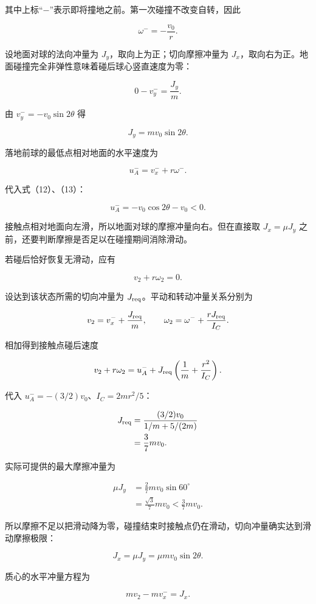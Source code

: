 \documentclass[12pt,a4paper,UTF8]{ctexart}
\begin{document}
其中上标``\(-\)''表示即将撞地之前。第一次碰撞不改变自转，因此

\[
\omega^-=-\frac{v_0}{r}.
\tag{13}
\]

设地面对球的法向冲量为 \(J_y\)，取向上为正；切向摩擦冲量为
\(J_x\)，取向右为正。地面碰撞完全非弹性意味着碰后球心竖直速度为零：

\[
0-v_y^-=\frac{J_y}{m}.
\tag{14}
\]

由 \(v_y^-=-v_0\sin2\theta\) 得

\[
\boxed{
J_y=mv_0\sin2\theta
}.
\tag{15}
\]

落地前球的最低点相对地面的水平速度为

\[
u_A^-=v_x^-+r\omega^-.
\tag{16}
\]

代入式（12）、（13）：

\[
u_A^-
=-v_0\cos2\theta-v_0<0.
\tag{17}
\]

接触点相对地面向左滑，所以地面对球的摩擦冲量向右。但在直接取
\(J_x=\mu J_y\) 之前，还要判断摩擦是否足以在碰撞期间消除滑动。

若碰后恰好恢复无滑动，应有

\[
v_2+r\omega_2=0.
\]

设达到该状态所需的切向冲量为 \(J_{\rm req}\)。平动和转动冲量关系分别为

\[
v_2=v_x^-+\frac{J_{\rm req}}m,
\qquad
\omega_2=\omega^-+\frac{rJ_{\rm req}}{I_C}.
\]

相加得到接触点碰后速度

\[
v_2+r\omega_2
=u_A^-+
J_{\rm req}\left(\frac1m+\frac{r^2}{I_C}\right).
\]

代入 \(u_A^-=-(3/2)v_0\)、\(I_C=2mr^2/5\)：

\[
\begin{aligned}
J_{\rm req}
&=\frac{(3/2)v_0}
{1/m+5/(2m)}\\
&=\frac37mv_0.
\end{aligned}
\]

实际可提供的最大摩擦冲量为

\[
\begin{aligned}
\mu J_y
&=\frac27mv_0\sin60^\circ\\
&=\frac{\sqrt3}{7}mv_0
<\frac37mv_0.
\end{aligned}
\]

所以摩擦不足以把滑动降为零，碰撞结束时接触点仍在滑动，切向冲量确实达到滑动摩擦极限：

\[
J_x=\mu J_y
=\mu mv_0\sin2\theta.
\tag{18}
\]

质心的水平冲量方程为

\[
mv_2-mv_x^-=J_x.
\tag{19}
\]
\end{document}
